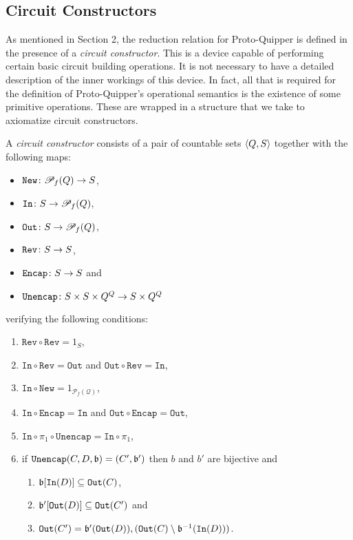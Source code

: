 \documentclass{article}
\begin{document}
\subsection{Circuit Constructors}

As mentioned in Section 2, the reduction relation for 
Proto-Quipper is defined in the presence of a \emph{circuit
constructor}. This is a device capable of 
performing certain basic circuit building operations. It is 
not necessary to have a detailed description of the inner 
workings of this device. In fact, all that is required for 
the definition of Proto-Quipper's operational semantics is 
the existence of some primitive operations. These are wrapped 
in a structure that we take to axiomatize circuit constructors. 

\begin{definition}
\label{circuit_constructor}
A \emph{circuit constructor} consists of a pair of countable sets $\langle Q,S\rangle$ 
together with the following maps:
\begin{itemize}
  \item $\mathtt{New}\colon {\mathscr{P}}_f(Q) \to S$,
  \item $\mathtt{In}\colon S\to {\mathscr{P}}_f(Q)$,
  \item $\mathtt{Out}\colon S\to {\mathscr{P}}_f(Q)$,
  \item $\mathtt{Rev}\colon S \to S$,
  \item $\mathtt{Encap}\colon S \to  S$ and
  \item $\mathtt{Unencap}\colon S\times S\times Q^Q \to S \times Q^Q$
\end{itemize}
verifying the following conditions:
\begin{enumerate}
  \item $\mathtt{Rev}\circ\mathtt{Rev}=1_S$,
  \item $\mathtt{In}\circ\mathtt{Rev}= \mathtt{Out}$ and 
        $\mathtt{Out}\circ\mathtt{Rev}= \mathtt{In}$\label{in_out_rev},
  \item $\mathtt{In}\circ\mathtt{New} =1_{\mathcal{P}_f(\mathcal{Q})}$,
  \item $\mathtt{In}\circ \mathtt{Encap} =\mathtt{In}$ and $\mathtt{Out}\circ \mathtt{Encap} =\mathtt{Out}$,
  \item $\mathtt{In}\circ\pi_1\circ\mathtt{Unencap}=\mathtt{In}\circ\pi_1$,\label{Unencap_In}
  \item if $\mathtt{Unencap} (C,D,\mathfrak{b})=(C',\mathfrak{b}')$ then $b$ and $b'$ are bijective and\label{Unencap_cond}
    \begin{enumerate}
      \item $\mathfrak{b}[\mathtt{In}(D)]\subseteq \mathtt{Out} (C)$,\label{Unencap_cond_1}
      \item $\mathfrak{b}'[\mathtt{Out}(D)]\subseteq\mathtt{Out}(C')$ and\label{Unencap_cond_2}
      \item $\mathtt{Out}(C')=\mathfrak{b}'(\mathtt{Out}(D)),(\mathtt{Out}(C)\setminus\mathfrak{b}^{-1}(\mathtt{In}(D)))$.\label{Unencap_cond_3}
    \end{enumerate}
\end{enumerate}
\end{definition}
\end{document}
